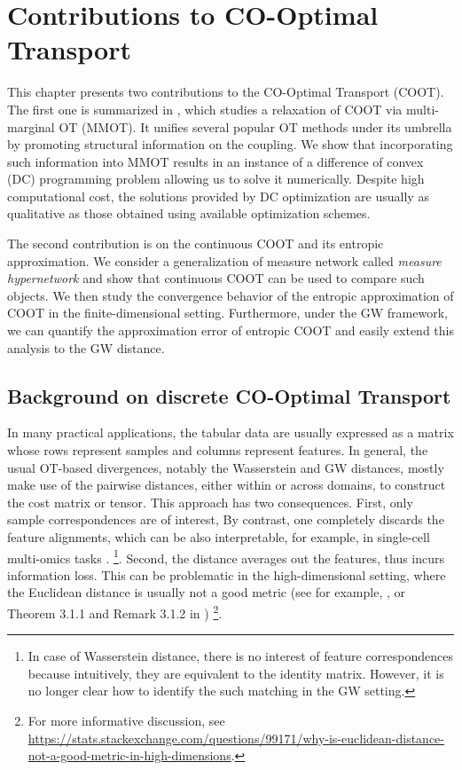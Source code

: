 
\chapter[Contributions to CO-Optimal Transport]{Contributions to CO-Optimal Transport}
\label{chap:coot}

\renewcommand{\contentsname}{Contents}
\localtableofcontents*
{}

\hfill \break
This chapter presents two contributions to the CO-Optimal Transport (COOT).
The first one is summarized in \citep{Tran21},
which studies a relaxation of COOT via multi-marginal OT (MMOT).
It unifies several popular OT methods under its umbrella by promoting structural information
on the coupling. We show that incorporating such information into MMOT results in an
instance of a difference of convex (DC) programming problem allowing us to solve it numerically.
Despite high computational cost, the solutions provided by DC optimization are usually
as qualitative as those obtained using available optimization schemes.

The second contribution is on the continuous COOT and its entropic approximation.
We consider a generalization of measure network called \textit{measure hypernetwork}
and show that continuous COOT can be used to compare such objects.
We then study the convergence behavior of the entropic approximation of COOT in the finite-dimensional
setting. Furthermore, under the GW framework, we can quantify the approximation error of
entropic COOT and easily extend this analysis to the GW distance.

\raggedbottom

\section{Background on discrete CO-Optimal Transport}

In many practical applications, the tabular data are usually expressed as a matrix whose rows
represent samples and columns represent features.
In general, the usual OT-based divergences, notably the Wasserstein and GW distances, mostly make
use of the pairwise distances, either within or across domains, to construct the cost matrix
or tensor. This approach has two consequences. First, only sample correspondences are of interest,
By contrast, one completely discards the feature alignments, which can be also interpretable,
for example, in single-cell multi-omics tasks \citep{Demetci20b}.
\footnote{In case of Wasserstein distance, there is no interest of feature correspondences
because intuitively, they are equivalent to the identity matrix. However,
it is no longer clear how to identify the such matching in the GW setting.}.
Second, the distance averages out the features, thus incurs information loss.
This can be problematic in the high-dimensional setting,
where the Euclidean distance is usually not a good metric
(see for example, \citep{Aggarwal01}, or Theorem 3.1.1 and Remark 3.1.2 in \citep{Vershynin18})
\footnote{For more informative discussion,
see \url{https://stats.stackexchange.com/questions/99171/why-is-euclidean-distance-not-a-good-metric-in-high-dimensions}.}.

